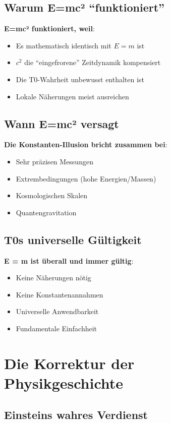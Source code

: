 	\subsection{Warum E=mc² ``funktioniert''}
	
	\textbf{E=mc² funktioniert, weil}:
	\begin{itemize}
		\item Es mathematisch identisch mit $E = m$ ist
		\item $c^2$ die ``eingefrorene'' Zeitdynamik kompensiert
		\item Die T0-Wahrheit unbewusst enthalten ist
		\item Lokale Näherungen meist ausreichen
	\end{itemize}
	
	\subsection{Wann E=mc² versagt}
	
	\textbf{Die Konstanten-Illusion bricht zusammen bei}:
	\begin{itemize}
		\item Sehr präzisen Messungen
		\item Extrembedingungen (hohe Energien/Massen)
		\item Kosmologischen Skalen
		\item Quantengravitation
	\end{itemize}
	
	\subsection{T0s universelle Gültigkeit}
	
	\textbf{E = m ist überall und immer gültig}:
	\begin{itemize}
		\item Keine Näherungen nötig
		\item Keine Konstantenannahmen
		\item Universelle Anwendbarkeit
		\item Fundamentale Einfachheit
	\end{itemize}
	
	\section{Die Korrektur der Physikgeschichte}
	
	\subsection{Einsteins wahres Verdienst}
	
